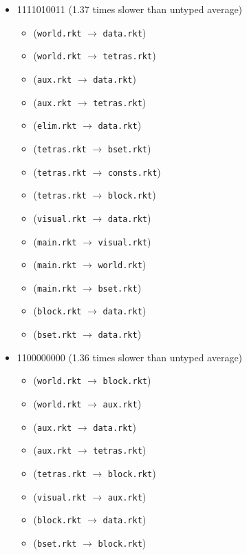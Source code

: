 \documentclass{article}
\newcommand{\mono}[1]{\texttt{#1}}
\begin{document}
\begin{itemize}
\item 1111010011 (1.37 times slower than untyped average)
  \begin{itemize}
  \item (\mono{world.rkt} $\rightarrow$ \mono{data.rkt})
  \item (\mono{world.rkt} $\rightarrow$ \mono{tetras.rkt})
  \item (\mono{aux.rkt} $\rightarrow$ \mono{data.rkt})
  \item (\mono{aux.rkt} $\rightarrow$ \mono{tetras.rkt})
  \item (\mono{elim.rkt} $\rightarrow$ \mono{data.rkt})
  \item (\mono{tetras.rkt} $\rightarrow$ \mono{bset.rkt})
  \item (\mono{tetras.rkt} $\rightarrow$ \mono{consts.rkt})
  \item (\mono{tetras.rkt} $\rightarrow$ \mono{block.rkt})
  \item (\mono{visual.rkt} $\rightarrow$ \mono{data.rkt})
  \item (\mono{main.rkt} $\rightarrow$ \mono{visual.rkt})
  \item (\mono{main.rkt} $\rightarrow$ \mono{world.rkt})
  \item (\mono{main.rkt} $\rightarrow$ \mono{bset.rkt})
  \item (\mono{block.rkt} $\rightarrow$ \mono{data.rkt})
  \item (\mono{bset.rkt} $\rightarrow$ \mono{data.rkt})
  \end{itemize}
\item 1100000000 (1.36 times slower than untyped average)
  \begin{itemize}
  \item (\mono{world.rkt} $\rightarrow$ \mono{block.rkt})
  \item (\mono{world.rkt} $\rightarrow$ \mono{aux.rkt})
  \item (\mono{aux.rkt} $\rightarrow$ \mono{data.rkt})
  \item (\mono{aux.rkt} $\rightarrow$ \mono{tetras.rkt})
  \item (\mono{tetras.rkt} $\rightarrow$ \mono{block.rkt})
  \item (\mono{visual.rkt} $\rightarrow$ \mono{aux.rkt})
  \item (\mono{block.rkt} $\rightarrow$ \mono{data.rkt})
  \item (\mono{bset.rkt} $\rightarrow$ \mono{block.rkt})
  \end{itemize}


\end{itemize}
\end{document}
